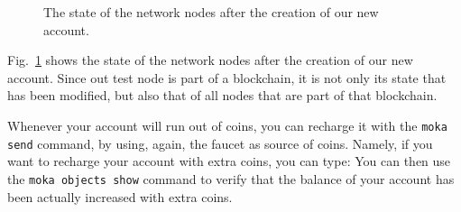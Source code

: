 \begin{figure}[t]
\begin{center}
  \end{center}

  \caption{The state of the network nodes after the creation of our new account.}
  \label{fig:state_with_account}
\end{figure}

Fig.~\ref{fig:state_with_account}
shows the state of the network nodes after the creation of our new account.
Since out test node is part of a blockchain, it is not only its state that has been modified,
but also that of all nodes that are part of that blockchain.

Whenever your account will run out of coins, you can recharge it with the
\texttt{moka send} command, by using, again, the faucet as source of coins. Namely,
if you want to recharge your account with \accountOneRecharge{} extra coins, you can type:
%
%
You can then use the \texttt{moka objects show} command to verify that the balance of
your account has been actually increased with \accountOneRecharge{} extra coins.

